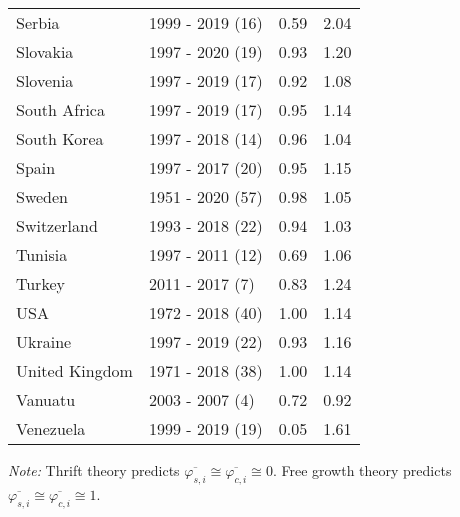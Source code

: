 \begin{table}[H]
{{\begin{tabular}{llrr}
Serbia & 1999 - 2019 (16) & 0.59 & 2.04\\
Slovakia & 1997 - 2020 (19) & 0.93 & 1.20\\
\addlinespace
Slovenia & 1997 - 2019 (17) & 0.92 & 1.08\\
South Africa & 1997 - 2019 (17) & 0.95 & 1.14\\
South Korea & 1997 - 2018 (14) & 0.96 & 1.04\\
Spain & 1997 - 2017 (20) & 0.95 & 1.15\\
Sweden & 1951 - 2020 (57) & 0.98 & 1.05\\
\addlinespace
Switzerland & 1993 - 2018 (22) & 0.94 & 1.03\\
Tunisia & 1997 - 2011 (12) & 0.69 & 1.06\\
Turkey & 2011 - 2017 (7) & 0.83 & 1.24\\
USA & 1972 - 2018 (40) & 1.00 & 1.14\\
Ukraine & 1997 - 2019 (22) & 0.93 & 1.16\\
\addlinespace
United Kingdom & 1971 - 2018 (38) & 1.00 & 1.14\\
Vanuatu & 2003 - 2007 (4) & 0.72 & 0.92\\
Venezuela & 1999 - 2019 (19) & 0.05 & 1.61\\
\bottomrule
\end{tabular}

}

}


\label{tbl-indicator_table}
\begin{flushleft}
\footnotesize \emph{Note:} Thrift theory predicts \(\overline{\varphi_{s,i}} \cong \overline{\varphi_{c,i}} \cong 0\). Free growth theory predicts \(\overline{\varphi_{s,i}} \cong \overline{\varphi_{c,i}} \cong 1\).
\end{flushleft}
\end{table}